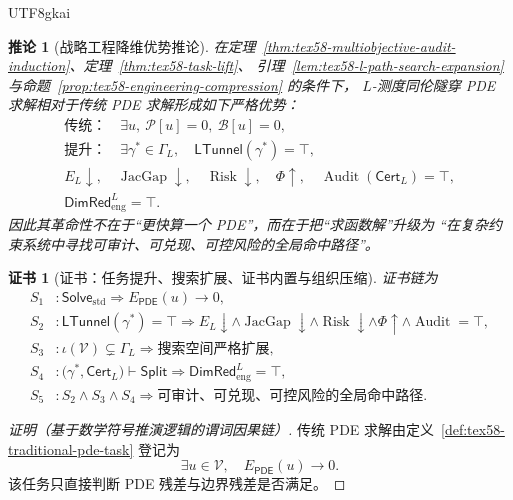 \documentclass[12pt]{article}
\newtheorem{corollary}{推论}[section]
\newtheorem{Certificate}{证书}[section]
\newcommand{\Pcal}{\mathcal P}
\newcommand{\Bcal}{\mathcal B}
\newcommand{\Vcal}{\mathcal V}
\newcommand{\PDE}{\ensuremath{\mathsf{PDE}}}
\DeclareMathOperator{\Audit}{Audit}
\DeclareMathOperator{\JacGap}{JacGap}
\DeclareMathOperator{\Risk}{Risk}
\begin{document}
\begin{CJK*}{UTF8}{gkai}
\begin{corollary}[战略工程降维优势推论]
\label{cor:tex58-strategic-engineering-dimred}
在定理~\ref{thm:tex58-multiobjective-audit-induction}、定理~\ref{thm:tex58-task-lift}、
引理~\ref{lem:tex58-l-path-search-expansion} 与命题~\ref{prop:tex58-engineering-compression} 的条件下，
\(L\)-测度同伦隧穿 PDE 求解相对于传统 PDE 求解形成如下严格优势：
\[
  \boxed{
  \begin{gathered}
  \text{传统：}\quad
  \exists u,\ \Pcal[u]=0,\ \Bcal[u]=0,\\
  \text{提升：}\quad
  \exists\gamma^\ast\in\Gamma_L,\quad
  \mathsf{LTunnel}(\gamma^\ast)=\top,\\
  E_L\downarrow,\quad
  \JacGap\downarrow,\quad
  \Risk\downarrow,\quad
  \Phi\uparrow,\quad
  \Audit(\mathsf{Cert}_L)=\top,\\
  \mathsf{DimRed}_{\mathrm{eng}}^L=\top.
  \end{gathered}
  }
\]
因此其革命性不在于“更快算一个 PDE”，而在于把“求函数解”升级为
“在复杂约束系统中寻找可审计、可兑现、可控风险的全局命中路径”。
\end{corollary}

\begin{Certificate}[证书：任务提升、搜索扩展、证书内置与组织压缩]
\label{cert:tex58-strategic-engineering-dimred}
证书链为
\[
\begin{aligned}
  S_1 &: \mathsf{Solve}_{\mathrm{std}}
         \Rightarrow
         E_{\PDE}(u)\to0,\\
  S_2 &: \mathsf{LTunnel}(\gamma^\ast)=\top
         \Rightarrow
         E_L\downarrow\wedge\JacGap\downarrow\wedge\Risk\downarrow\wedge\Phi\uparrow
         \wedge\Audit=\top,\\
  S_3 &: \iota(\Vcal)\subsetneq\Gamma_L
         \Rightarrow
         \text{搜索空间严格扩展},\\
  S_4 &: \bigl(\gamma^\ast,\mathsf{Cert}_L\bigr)\vdash\mathsf{Split}
         \Rightarrow
         \mathsf{DimRed}_{\mathrm{eng}}^L=\top,\\
  S_5 &: S_2\wedge S_3\wedge S_4
         \Rightarrow
         \text{可审计、可兑现、可控风险的全局命中路径}.
\end{aligned}
\]
\end{Certificate}

\begin{proof}[证明（基于数学符号推演逻辑的谓词因果链）]
传统 PDE 求解由定义~\ref{def:tex58-traditional-pde-task} 登记为
\[
  \exists u\in\Vcal,\quad E_{\PDE}(u)\to0.
\]
该任务只直接判断 PDE 残差与边界残差是否满足。


\end{proof}
\end{CJK*}
\end{document}
